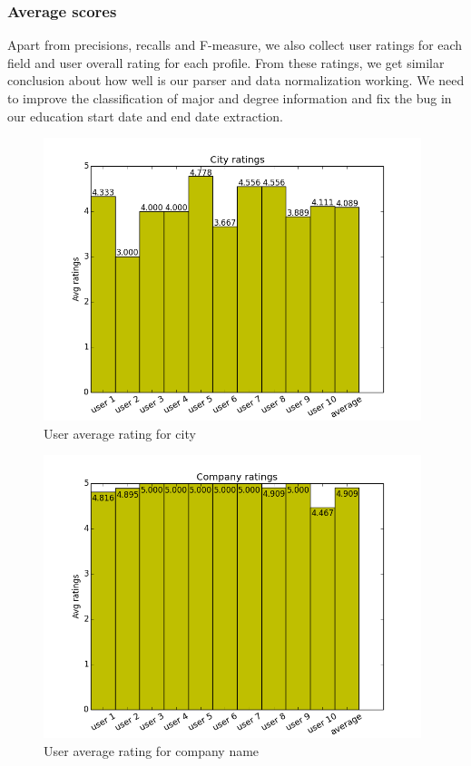 \subsubsection{Average scores}

Apart from precisions, recalls and F-measure, we also collect user ratings for each field and user overall rating for each profile. From these ratings, we get similar conclusion about how well is our parser and data normalization working. We need to improve the classification of major and degree information and fix the bug in our education start date and end date extraction.

\begin{figure}[H]
\centering
\includegraphics[width=110mm]{images/evaluation/average_city_score.png}
\caption{User average rating for city}
\label{fig:city}
\end{figure}

\begin{figure}[H]
\centering
\includegraphics[width=110mm]{images/evaluation/average_company_score.png}
\caption{User average rating for company name}
\label{fig:company}
\end{figure}


